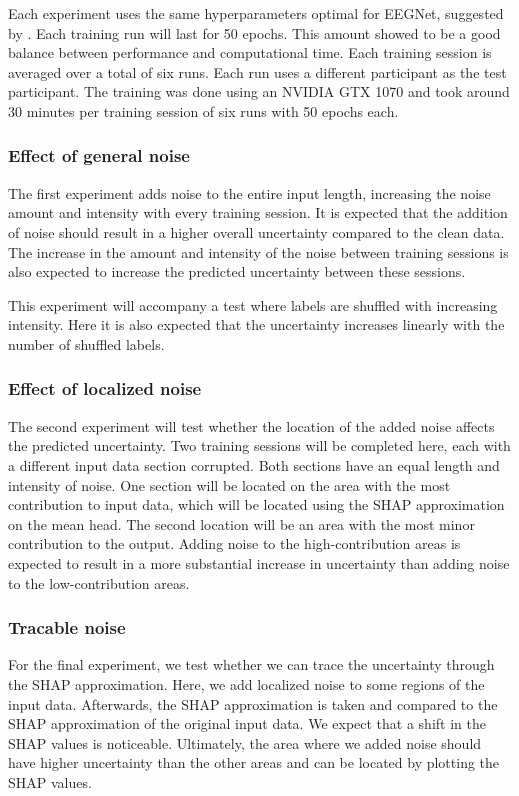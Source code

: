 Each experiment uses the same hyperparameters optimal for EEGNet, suggested by \cite{lawhern2018eegnet}. Each training run will last for 50 epochs. This amount showed to be a good balance between performance and computational time. Each training session is averaged over a total of six runs. Each run uses a different participant as the test participant. The training was done using an NVIDIA GTX 1070 and took around 30 minutes per training session of six runs with 50 epochs each.

\subsubsection{Effect of general noise}

The first experiment adds noise to the entire input length, increasing the noise amount and intensity with every training session. It is expected that the addition of noise should result in a higher overall uncertainty compared to the clean data. The increase in the amount and intensity of the noise between training sessions is also expected to increase the predicted uncertainty between these sessions.

This experiment will accompany a test where labels are shuffled with increasing intensity. Here it is also expected that the uncertainty increases linearly with the number of shuffled labels. 

\subsubsection{Effect of localized noise}

The second experiment will test whether the location of the added noise affects the predicted uncertainty. Two training sessions will be completed here, each with a different input data section corrupted. Both sections have an equal length and intensity of noise. One section will be located on the area with the most contribution to input data, which will be located using the SHAP approximation on the mean head. The second location will be an area with the most minor contribution to the output. Adding noise to the high-contribution areas is expected to result in a more substantial increase in uncertainty than adding noise to the low-contribution areas.

\subsubsection{Tracable noise}

For the final experiment, we test whether we can trace the uncertainty through the SHAP approximation. Here, we add localized noise to some regions of the input data. Afterwards, the SHAP approximation is taken and compared to the SHAP approximation of the original input data. We expect that a shift in the SHAP values is noticeable. Ultimately, the area where we added noise should have higher uncertainty than the other areas and can be located by plotting the SHAP values.
